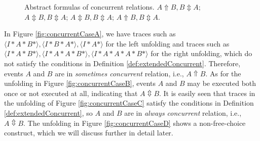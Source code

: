 \documentclass{llncs}
\begin{document}
\begin{figure}[htbp]
{\begin{minipage}[b]{0.35\textwidth}
	\end{minipage}
	\label{fig:concurrentCaseC}
}
\caption{Abstract formulas of concurrent relations.  $A\Uparrow B,B\Updownarrow A$;  $A\Updownarrow B,B\Updownarrow A$;  $A\Updownarrow B,B\Updownarrow A$;  $A\Uparrow B,B\Updownarrow A$.\label{fig:concurrentCases}}
\end{figure}

In Figure \ref{fig:concurrentCaseA}, we have traces such as $\langle I*A*B*\rangle ,\langle I*B*A*\rangle ,\langle I*A*\rangle $ for the left unfolding and traces such as $\langle I*A*B*\rangle ,\langle I*A*A*B*\rangle ,\langle I*A*A*A*B*\rangle$ for the right unfolding, which do not satisfy the conditions in Definition \ref{def:extendedConcurrent}. Therefore, events $A$ and $B$ are in \textit{sometimes concurrent} relation, i.e., $A\Uparrow B$. As for the unfolding in Figure \ref{fig:concurrentCaseB}, events $A$ and $B$ may be executed both once or not executed at all, indicating that $A\Updownarrow B$. It is easily seen that traces in the unfolding of Figure \ref{fig:concurrentCaseC} satisfy the conditions in Definition \ref{def:extendedConcurrent}, so $A$ and $B$ are in \textit{always concurrent} relation, i.e., $A\Updownarrow B$. The unfolding in Figure \ref{fig:concurrentCaseD} shows a non-free-choice construct, which we will discuss further in detail later.
\end{document}
